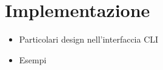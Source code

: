 \chapter{Implementazione}

\begin{itemize}
	\item Particolari design nell'interfaccia CLI
	\item Esempi
\end{itemize}
